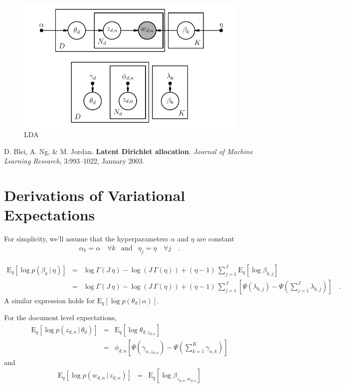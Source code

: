 \documentclass[11pt]{article}
\newcommand{\figlabel}[1]{\label{fig:#1}}
\newcommand{\expect}[2]{\ensuremath{\mathrm{E}_{#1}\left [ {#2} \right ]}}
\begin{document}
\begin{figure}
\begin{center}
\includegraphics{lda.pdf}
\end{center}
\caption{%
LDA
\figlabel{lda}}
\end{figure}

\begin{thebibliography}{}\raggedright

D. Blei, A. Ng, \& M. Jordan. \textbf{Latent Dirichlet allocation}.
\emph{Journal of Machine Learning Research}, 3:993–1022, January 2003.

\end{thebibliography}

\appendix

\section{Derivations of Variational Expectations}

For simplicity, we'll assume that the hyperparameters $\alpha$ and $\eta$ are
constant
\begin{eqnarray}
\alpha_k = \alpha\quad\forall k &\mathrm{and}&
\eta_j = \eta\quad\forall j \quad.
\end{eqnarray}

\begin{eqnarray}
\expect{q}{\log p(\beta_k\,|\,\eta)} &=&
\log \Gamma (J\,\eta) - \log \left ( J\,\Gamma(\eta) \right )
+ (\eta-1)\,\sum_{j=1}^J \expect{q}{\log\beta_{k,j}} \nonumber\\
&=&
\log \Gamma (J\,\eta) - \log \left ( J\,\Gamma(\eta) \right )
+ (\eta-1)\,\sum_{j=1}^J \left[ \Psi (\lambda_{k,j})
- \Psi({\textstyle\sum}_{j=1}^J \lambda_{k,j}) \right] \quad.
\end{eqnarray}
A similar expression holds for $\expect{q}{\log p(\theta_d\,|\,\alpha)}$.

For the document level expectations,
\begin{eqnarray}
\expect{q}{\log p(z_{d,n}\,|\,\theta_d)} &=&
\expect{q}{\log \theta_{d,z_{d,n}}} \nonumber \\
&=&
\phi_{d,n}
\left[\Psi (\gamma_{n,z_{d,n}}) - \Psi({\textstyle\sum}_{k=1}^K \gamma_{n,k})
\right]
\end{eqnarray}
and
\begin{eqnarray}
\expect{q}{\log p(w_{d,n}\,|\,z_{d,n})} &=&
\expect{q}{\log \beta_{z_{d,n},w_{d,n}}}
\end{eqnarray}
\end{document}
